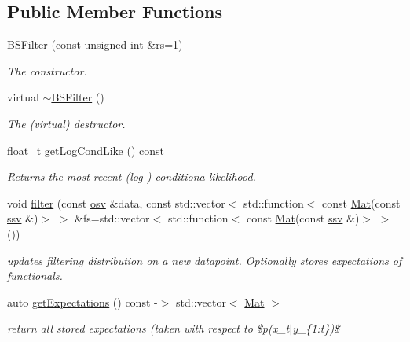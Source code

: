 \subsection*{Public Member Functions}
\begin{DoxyCompactItemize}
\item 
\hyperlink{classBSFilter_ab4cab4322cfd2f3f2ed1d4d9b8d058f7}{B\+S\+Filter} (const unsigned int \&rs=1)
\begin{DoxyCompactList}\small\item\em The constructor. \end{DoxyCompactList}\item 
\mbox{\label{classBSFilter_a73ee518e89b539464a09430ef541ea7f}} 
virtual \hyperlink{classBSFilter_a73ee518e89b539464a09430ef541ea7f}{$\sim$\+B\+S\+Filter} ()
\begin{DoxyCompactList}\small\item\em The (virtual) destructor. \end{DoxyCompactList}\item 
float\+\_\+t \hyperlink{classBSFilter_a9cc91baeaaa2a22bff48d82157c86ec5}{get\+Log\+Cond\+Like} () const
\begin{DoxyCompactList}\small\item\em Returns the most recent (log-\/) conditiona likelihood. \end{DoxyCompactList}\item 
void \hyperlink{classBSFilter_a76a59b050d0cc0397b1f594a0a1c22ac}{filter} (const \hyperlink{classBSFilter_a9a4da560f11a6e2d35ffe693de54826b}{osv} \&data, const std\+::vector$<$ std\+::function$<$ const \hyperlink{classBSFilter_a190a71c131060b131c11ebe2c3fefbeb}{Mat}(const \hyperlink{classBSFilter_ad2341b982bcdabc798d7ed0f327d28f7}{ssv} \&)$>$ $>$ \&fs=std\+::vector$<$ std\+::function$<$ const \hyperlink{classBSFilter_a190a71c131060b131c11ebe2c3fefbeb}{Mat}(const \hyperlink{classBSFilter_ad2341b982bcdabc798d7ed0f327d28f7}{ssv} \&)$>$ $>$())
\begin{DoxyCompactList}\small\item\em updates filtering distribution on a new datapoint. Optionally stores expectations of functionals. \end{DoxyCompactList}\item 
auto \hyperlink{classBSFilter_a837a9dc83c07195fb96b4228dc8e41fe}{get\+Expectations} () const -\/$>$ std\+::vector$<$ \hyperlink{classBSFilter_a190a71c131060b131c11ebe2c3fefbeb}{Mat} $>$
\begin{DoxyCompactList}\small\item\em return all stored expectations (taken with respect to \$p(x\+\_\+t$\vert$y\+\_\+\{1\+:t\})\$ \end{DoxyCompactList}\item 

\end{DoxyCompactItemize}
